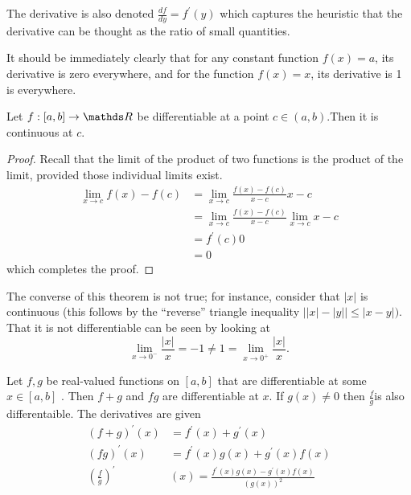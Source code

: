 \begin{rem*}
	The derivative is also denoted $\frac{df}{dy}=f^{\prime}\left(y\right)$
	which captures the heuristic that the derivative can be thought as
	the ratio of small quantities.
\end{rem*}
\begin{example}
	\label{exa:derivativeConstant}It should be immediately clearly that
	for any constant function $f\left(x\right)=a$, its derivative is
	zero everywhere, and for the function $f\left(x\right)=x$, its derivative
	is 1 is everywhere.
\end{example}

\begin{prop}
	\label{prop:differentiableImpliesContinuous}Let $f:\left[a,b\right]\to\R$
	be differentiable at a point $c\in\left(a,b\right).$Then it is continuous
	at $c.$
\end{prop}

\begin{proof}
	Recall that the limit of the product of two functions is the product
	of the limit, provided those individual limits exist. 
	\begin{align*}
		\lim_{x\to c}f\left(x\right)-f\left(c\right) & =\lim_{x\to c}\frac{f\left(x\right)-f\left(c\right)}{x-c}x-c\\
		& =\lim_{x\to c}\frac{f\left(x\right)-f\left(c\right)}{x-c}\lim_{x\to c}x-c\\
		& =f^{\prime}\left(c\right)0\\
		& =0
	\end{align*}
	which completes the proof.
\end{proof}
\begin{rem*}
	The converse of this theorem is not true; for instance, consider that
	$\lvert x\rvert$ is continuous (this follows by the ``reverse''
	triangle inequality $\lvert\lvert x\rvert-\lvert y\rvert\rvert\leq\lvert x-y\rvert)$.
	That it is not differentiable can be seen by looking at 
	\[
	\lim_{x\to0^{-}}\frac{\lvert x\rvert}{x}=-1\neq1=\lim_{x\to0^{+}}\frac{\lvert x\rvert}{x}.
	\]
\end{rem*}
\begin{prop}
	\label{prop:algebraOfDifferentiableFunctions}Let $f,g$ be real-valued
	functions on $\left[a,b\right]$ that are differentiable at some $x\in\left[a,b\right]$
	. Then $f+g$ and $fg$ are differentiable at $x.$ If $g\left(x\right)\neq0$
	then $\frac{f}{g}$is also differentaible. The derivatives are given
	\begin{align}
		\left(f+g\right)^{\prime}\left(x\right) & =f^{\prime}\left(x\right)+g^{\prime}\left(x\right)\\
		\left(fg\right)^{\prime}\left(x\right) & =f^{\prime}\left(x\right)g\left(x\right)+g^{\prime}\left(x\right)f\left(x\right)\\
		\left(\frac{f}{g}\right)^{\prime} & \left(x\right)=\frac{f^{\prime}\left(x\right)g\left(x\right)-g^{\prime}\left(x\right)f\left(x\right)}{\left(g\left(x\right)\right)^{2}}
	\end{align}
\end{prop}

